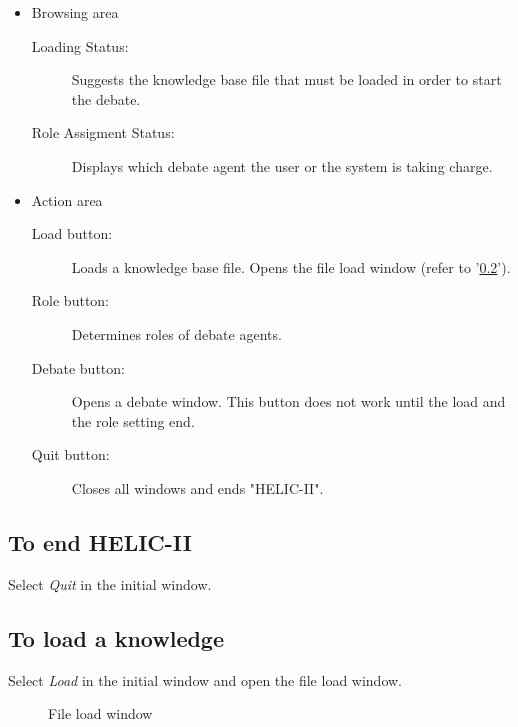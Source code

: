 \begin{itemize}
\item Browsing area
\begin{description}
\item[Loading Status:] Suggests the knowledge base file that must be loaded in order to start the debate.
\item[Role Assigment Status:] Displays which debate agent the user or the system is taking charge.
\end{description}
\item Action area
\begin{description}
\item[Load button:] Loads a knowledge base file.
Opens the file load window (refer to '\ref{To load a knowledge}').
\item[Role button:] Determines roles of debate agents.
\item[Debate button:] Opens a debate window.
This button does not work until the load and the role setting end.
\item[Quit button:] Closes all windows and ends "HELIC-II".
\end{description}
\end{itemize}

\subsection{To end HELIC-II}
Select {\sl Quit} in the initial window.

\subsection{To load a knowledge}\label{To load a knowledge}
Select {\sl Load} in the initial window and open the file load window.

\begin{figure}[htb]
\begin{center}
\end{center}
\caption{File load window}\label{File load window}
\end{figure}

